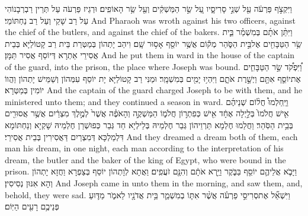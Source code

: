 {וַיִּקְצֹ֣ף פַּרְעֹ֔ה עַ֖ל שְׁנֵ֣י סָרִיסָ֑יו עַ֚ל שַׂ֣ר הַמַּשְׁקִ֔ים וְעַ֖ל שַׂ֥ר הָאוֹפִֽים׃}
{וּרְגֵיז פַּרְעֹה עַל תְּרֵין רַבְרְבָנוֹהִי עַל רַב שָׁקֵי וְעַל רַב נַחְתּוֹמֵי׃}
{And Pharaoh was wroth against his two officers, against the chief of the butlers, and against the chief of the bakers.}{}
{וַיִּתֵּ֨ן אֹתָ֜ם בְּמִשְׁמַ֗ר בֵּ֛ית שַׂ֥ר הַטַּבָּחִ֖ים אֶל\maqqaf בֵּ֣ית הַסֹּ֑הַר מְק֕וֹם אֲשֶׁ֥ר יוֹסֵ֖ף אָס֥וּר שָֽׁם׃}
{וִיהַב יָתְהוֹן בְּמַטְּרַת בֵּית רַב קָטוֹלַיָּא בְּבֵית אֲסִירֵי אַתְרָא דְּיוֹסֵף אֲסִיר תַּמָּן׃}
{And he put them in ward in the house of the captain of the guard, into the prison, the place where Joseph was bound.}{}
{וַ֠יִּפְקֹ֠ד שַׂ֣ר הַטַּבָּחִ֧ים אֶת\maqqaf יוֹסֵ֛ף אִתָּ֖ם וַיְשָׁ֣רֶת אֹתָ֑ם וַיִּהְי֥וּ יָמִ֖ים בְּמִשְׁמָֽר׃}
{וּמַנִּי רַב קָטוֹלַיָּא יָת יוֹסֵף עִמְּהוֹן וְשַׁמֵּישׁ יָתְהוֹן וַהֲווֹ יוֹמִין בְּמַטְּרָא׃}
{And the captain of the guard charged Joseph to be with them, and he ministered unto them; and they continued a season in ward.}{}
{וַיַּֽחַלְמוּ֩ חֲל֨וֹם שְׁנֵיהֶ֜ם אִ֤ישׁ חֲלֹמוֹ֙ בְּלַ֣יְלָה אֶחָ֔ד אִ֖ישׁ כְּפִתְר֣וֹן חֲלֹמ֑וֹ הַמַּשְׁקֶ֣ה וְהָאֹפֶ֗ה אֲשֶׁר֙ לְמֶ֣לֶךְ מִצְרַ֔יִם אֲשֶׁ֥ר אֲסוּרִ֖ים בְּבֵ֥ית הַסֹּֽהַר׃}
{וַחֲלַמוּ חֶלְמָא תַּרְוֵיהוֹן גְּבַר חֶלְמֵיהּ בְּלֵילְיָא חַד גְּבַר כְּפוּשְׁרַן חֶלְמֵיהּ שָׁקְיָא וְנַחְתּוֹמָא דִּלְמַלְכָּא דְּמִצְרַיִם דַּאֲסִירִין בְּבֵית אֲסִירֵי׃}
{And they dreamed a dream both of them, each man his dream, in one night, each man according to the interpretation of his dream, the butler and the baker of the king of Egypt, who were bound in the prison.}{}
{וַיָּבֹ֧א אֲלֵיהֶ֛ם יוֹסֵ֖ף בַּבֹּ֑קֶר וַיַּ֣רְא אֹתָ֔ם וְהִנָּ֖ם זֹעֲפִֽים׃}
{וַאֲתָא לְוָתְהוֹן יוֹסֵף בְּצַפְרָא וַחֲזָא יָתְהוֹן וְהָא אִנּוּן נְסִיסִין׃}
{And Joseph came in unto them in the morning, and saw them, and, behold, they were sad.}{}
{וַיִּשְׁאַ֞ל אֶת\maqqaf סְרִיסֵ֣י פַרְעֹ֗ה אֲשֶׁ֨ר אִתּ֧וֹ בְמִשְׁמַ֛ר בֵּ֥ית אֲדֹנָ֖יו לֵאמֹ֑ר מַדּ֛וּעַ פְּנֵיכֶ֥ם רָעִ֖ים הַיּֽוֹם׃}
